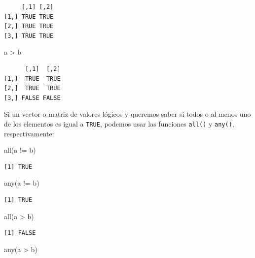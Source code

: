 \documentclass[
]{book}
\newenvironment{Shaded}{\begin{snugshade}}{\end{snugshade}}
\newcommand{\FunctionTok}[1]{\textcolor[rgb]{0.00,0.00,0.00}{#1}}
\newcommand{\NormalTok}[1]{#1}
\newcommand{\SpecialCharTok}[1]{\textcolor[rgb]{0.00,0.00,0.00}{#1}}
\begin{document}
\begin{verbatim}
     [,1] [,2]
[1,] TRUE TRUE
[2,] TRUE TRUE
[3,] TRUE TRUE
\end{verbatim}

\begin{Shaded}
\begin{Highlighting}[]
\NormalTok{a }\SpecialCharTok{\textgreater{}}\NormalTok{ b}
\end{Highlighting}
\end{Shaded}

\begin{verbatim}
      [,1]  [,2]
[1,]  TRUE  TRUE
[2,]  TRUE  TRUE
[3,] FALSE FALSE
\end{verbatim}

Si un vector o matriz de valores lógicos y queremos saber si todos o al menos uno de los elementos es igual a \texttt{TRUE}, podemos usar las funciones \texttt{all()} y \texttt{any()}, respectivamente:

\begin{Shaded}
\begin{Highlighting}[]
\FunctionTok{all}\NormalTok{(a }\SpecialCharTok{!=}\NormalTok{ b)}
\end{Highlighting}
\end{Shaded}

\begin{verbatim}
[1] TRUE
\end{verbatim}

\begin{Shaded}
\begin{Highlighting}[]
\FunctionTok{any}\NormalTok{(a }\SpecialCharTok{!=}\NormalTok{ b)}
\end{Highlighting}
\end{Shaded}

\begin{verbatim}
[1] TRUE
\end{verbatim}

\begin{Shaded}
\begin{Highlighting}[]
\FunctionTok{all}\NormalTok{(a }\SpecialCharTok{\textgreater{}}\NormalTok{ b)}
\end{Highlighting}
\end{Shaded}

\begin{verbatim}
[1] FALSE
\end{verbatim}

\begin{Shaded}
\begin{Highlighting}[]
\FunctionTok{any}\NormalTok{(a }\SpecialCharTok{\textgreater{}}\NormalTok{ b)}
\end{Highlighting}
\end{Shaded}
\end{document}
